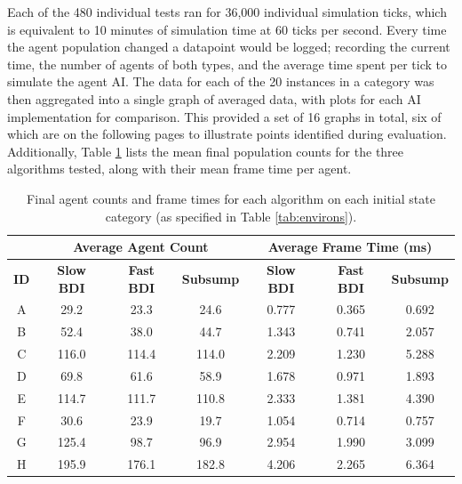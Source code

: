 \documentclass[a4paper,12pt]{article}
\begin{document}
Each of the 480 individual tests ran for 36,000 individual simulation ticks, which is equivalent to 10 minutes of simulation time at 60 ticks per second. Every time the agent population changed a datapoint would be logged; recording the current time, the number of agents of both types, and the average time spent per tick to simulate the agent AI. The data for each of the 20 instances in a category was then aggregated into a single graph of averaged data, with plots for each AI implementation for comparison. This provided a set of 16 graphs in total, six of which are on the following pages to illustrate points identified during evaluation. Additionally, Table \ref{tab:results} lists the mean final population counts for the three algorithms tested, along with their mean frame time per agent.

\begin{table}[ht]
\centering
\begin{tabular}{|c|c|c|c|c|c|c|} \hline
& \multicolumn{3}{c|}{\bf Average Agent Count} & \multicolumn{3}{c|}{\bf Average Frame Time (ms)} \\ \hline
{\bf \small ID} & {\bf \small Slow BDI} & {\bf \small Fast BDI} & {\bf \small Subsump} & {\bf \small Slow BDI} & {\bf \small Fast BDI} & {\bf \small Subsump} \\ \hline
A & 29.2 & 23.3 & 24.6 & 0.777 & 0.365 & 0.692 \\
B & 52.4 & 38.0 & 44.7 & 1.343 & 0.741 & 2.057 \\
C & 116.0 & 114.4 & 114.0 & 2.209 & 1.230 & 5.288 \\ \hline
D & 69.8 & 61.6 & 58.9 & 1.678 & 0.971 & 1.893 \\
E & 114.7 & 111.7 & 110.8 & 2.333 & 1.381 & 4.390 \\
F & 30.6 & 23.9 & 19.7 & 1.054 & 0.714 & 0.757 \\
G & 125.4 & 98.7 & 96.9 & 2.954 & 1.990 & 3.099 \\
H & 195.9 & 176.1 & 182.8 & 4.206 & 2.265 & 6.364 \\ \hline
\end{tabular}
\caption{Final agent counts and frame times for each algorithm on each initial state category (as specified in Table \ref{tab:environs}).}
\label{tab:results}
\end{table}
\end{document}
